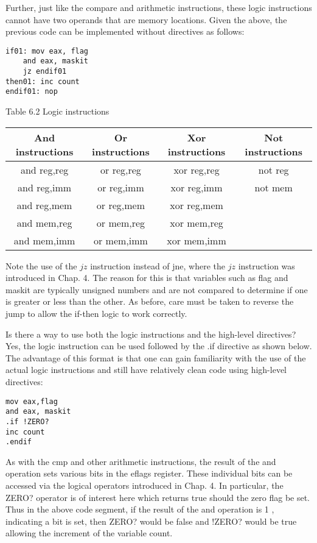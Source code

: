 \documentclass[10pt]{article}
\begin{document}
Further, just like the compare and arithmetic instructions, these logic instructions cannot have two operands that are memory locations. Given the above, the previous code can be implemented without directives as follows:

\begin{verbatim}
if01: mov eax, flag
    and eax, maskit
    jz endif01
then01: inc count
endif01: nop
\end{verbatim}

Table 6.2 Logic instructions

\begin{center}
\begin{tabular}{|c|c|c|c|}
\hline
And instructions & Or instructions & Xor instructions & Not instructions \\
\hline
and reg,reg & or reg,reg & xor reg,reg & not reg \\
\hline
and reg,imm & or reg,imm & xor reg,imm & not mem \\
\hline
and reg,mem & or reg,mem & xor reg,mem &  \\
\hline
and mem,reg & or mem,reg & xor mem,reg &  \\
\hline
and mem,imm & or mem,imm & xor mem,imm &  \\
\hline
\end{tabular}
\end{center}

Note the use of the $j z$ instruction instead of jne, where the $j z$ instruction was introduced in Chap. 4. The reason for this is that variables such as flag and maskit are typically unsigned numbers and are not compared to determine if one is greater or less than the other. As before, care must be taken to reverse the jump to allow the if-then logic to work correctly.

Is there a way to use both the logic instructions and the high-level directives? Yes, the logic instruction can be used followed by the .if directive as shown below. The advantage of this format is that one can gain familiarity with the use of the actual logic instructions and still have relatively clean code using high-level directives:

\begin{verbatim}
mov eax,flag
and eax, maskit
.if !ZERO?
inc count
.endif
\end{verbatim}

As with the cmp and other arithmetic instructions, the result of the and operation sets various bits in the eflags register. These individual bits can be accessed via the logical operators introduced in Chap. 4. In particular, the ZERO? operator is of interest here which returns true should the zero flag be set. Thus in the above code segment, if the result of the and operation is 1 , indicating a bit is set, then ZERO? would be false and !ZERO? would be true allowing the increment of the variable count.
\end{document}
